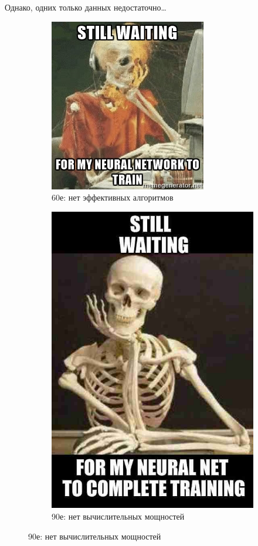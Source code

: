 \documentclass[aspectratio=169]{beamer}
\begin{document}
\begin{frame}{Однако, одних только данных недостаточно\ldots}
    \begin{figure}
        \begin{subfigure}{.49\linewidth}
            \centering
            \includegraphics[width=.76\linewidth]{graphs/fig22_0.jpg}
            \caption*{60е: нет эффективных алгоритмов}
        \end{subfigure}
        \pause{}
        \begin{subfigure}{.49\linewidth}
            \centering
            \includegraphics[width=.57\linewidth]{graphs/fig22_1.jpg}
            \caption*{90е: нет вычислительных мощностей}
        \end{subfigure}
    \end{figure}
\end{frame}
\end{document}
